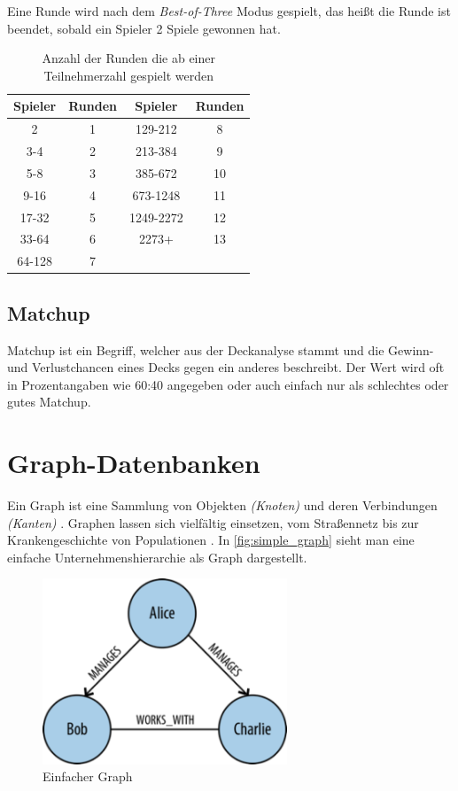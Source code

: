 Eine Runde wird nach dem \emph{Best-of-Three} Modus gespielt, das heißt die Runde ist beendet, sobald ein Spieler 2 Spiele gewonnen hat. 

\begin{table}[t]
    \myfloatalign
    \caption{Anzahl der Runden die ab einer Teilnehmerzahl gespielt werden \cite{wotc:swiss}} 
    \begin{tabular}{cc|cc}
        \toprule 
        Spieler & Runden & Spieler & Runden \\ 
        \midrule 
        2      & 1 & 129-212   & 8  \\ 
        3-4    & 2 & 213-384   & 9  \\ 
        5-8    & 3 & 385-672   & 10 \\ 
        9-16   & 4 & 673-1248  & 11 \\ 
        17-32  & 5 & 1249-2272 & 12 \\ 
        33-64  & 6 & 2273+     & 13 \\ 
        64-128 & 7 &           &  \\ 
        \bottomrule 
    \end{tabular}
    \label{tab:swisspairings}
\end{table}

\subsection{Matchup}
Matchup ist ein Begriff, welcher aus der Deckanalyse stammt und die Gewinn- und Verlustchancen eines Decks gegen ein anderes beschreibt. Der Wert wird oft in Prozentangaben wie 60:40 angegeben oder auch einfach nur als schlechtes oder gutes Matchup.

\section{Graph-Datenbanken}
Ein Graph ist eine Sammlung von Objekten \emph{(Knoten)} und deren Verbindungen \emph{(Kanten)} \cite{robinsongraph:2015}. Graphen lassen sich vielfältig einsetzen, vom Straßennetz bis zur Krankengeschichte von Populationen \cite{robinsongraph:2015}. In \autoref{fig:simple_graph} sieht man eine einfache Unternehmenshierarchie als Graph dargestellt. 

\begin{figure}[h]
    \myfloatalign
    \includegraphics[width=0.65\textwidth]{gfx/simple_graph.png}
    \caption{Einfacher Graph \cite{neo4jblog:graph}}
    \label{fig:simple_graph}
\end{figure}

